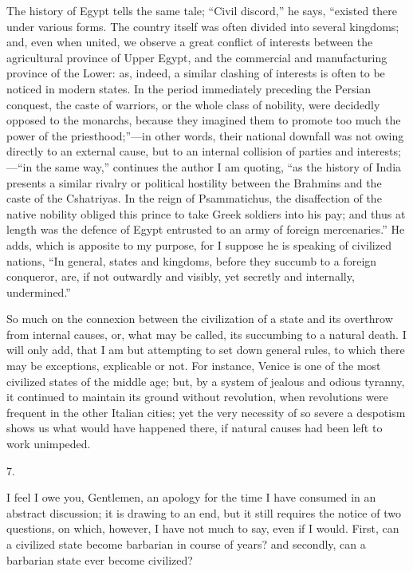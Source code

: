 The history of Egypt tells the
same tale; ``Civil discord,'' he says, ``existed there under various
forms. The country itself was often divided into several kingdoms;
and, even when united, we observe a great conflict of interests
between the agricultural province of Upper Egypt, and the commercial
and manufacturing province of the Lower: as, indeed, a similar
clashing of interests is often to be noticed in modern states. In the
period immediately preceding the Persian conquest, the caste of
warriors, or the whole class of nobility, were decidedly opposed to
the monarchs, because they imagined them to promote too much the power
of the priesthood;''—in other words, their national downfall was not
owing directly to an external cause, but to an internal collision of
parties and interests;—``in the same way,'' continues the author
I am quoting, ``as the history of India presents a similar rivalry or
political hostility between the Brahmins and the caste of the
Cshatriyas. In the reign of Psammatichus, the disaffection of the
native nobility obliged this prince to take Greek soldiers into his
pay; and thus at length was the defence of Egypt entrusted to an army
of foreign mercenaries.'' He adds, which is apposite to my purpose, for
I suppose he is speaking of civilized nations, ``In general, states and
kingdoms, before they succumb to a foreign conqueror, are, if not
outwardly and visibly, yet secretly and internally, undermined.''

So much on the connexion
between the civilization of a state and its overthrow from internal
causes, or, what may be called, its succumbing to a natural death. I
will only add, that I am but attempting to set down general rules, to
which there may be exceptions, explicable or not. For instance, Venice
is one of the most civilized states of the middle age; but, by a
system of jealous and odious tyranny, it continued to maintain its
ground without revolution, when revolutions were frequent in the other
Italian cities; yet the very necessity of so severe a despotism shows
us what would have happened there, if natural causes had been left to
work unimpeded.

7.

I feel I owe you, Gentlemen,
an apology for the time I have consumed in an abstract discussion; it
is drawing to an end, but it still requires the notice of two
questions, on which, however, I have not much to say, even if I would.
First, can a civilized state become barbarian in course of years? and
secondly, can a barbarian state ever become civilized?

